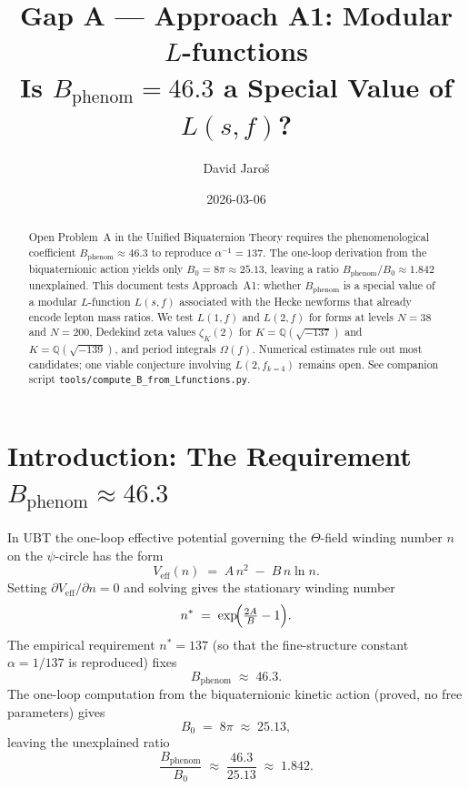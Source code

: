 \documentclass[12pt,a4paper]{article}
\title{\textbf{Gap A --- Approach A1: Modular $L$-functions}\\
         \large Is $B_{\mathrm{phenom}} = 46.3$ a Special Value of $L(s,f)$?}
\author{David Jaro\v{s}}
\date{2026-03-06}
\theoremstyle{definition}
\theoremstyle{remark}
\begin{document}
  \maketitle

  \begin{abstract}
  Open Problem~A in the Unified Biquaternion Theory requires the phenomenological
  coefficient $B_{\mathrm{phenom}} \approx 46.3$ to reproduce $\alpha^{-1} = 137$.
  The one-loop derivation from the biquaternionic action yields only $B_0 = 8\pi
  \approx 25.13$, leaving a ratio $B_{\mathrm{phenom}}/B_0 \approx 1.842$ unexplained.
  This document tests Approach~A1: whether $B_{\mathrm{phenom}}$ is a special value
  of a modular $L$-function $L(s,f)$ associated with the Hecke newforms that already
  encode lepton mass ratios.  We test $L(1,f)$ and $L(2,f)$ for forms at levels
  $N = 38$ and $N = 200$, Dedekind zeta values $\zeta_K(2)$ for
  $K = \mathbb{Q}(\sqrt{-137})$ and $K = \mathbb{Q}(\sqrt{-139})$, and period
  integrals $\Omega(f)$.  Numerical estimates rule out most candidates; one viable
  conjecture involving $L(2, f_{k=4})$ remains open.  See companion script
  \texttt{tools/compute\_B\_from\_Lfunctions.py}.
  \end{abstract}
\fi

\section{Introduction: The Requirement $B_{\mathrm{phenom}} \approx 46.3$}
\label{sec:intro}

In UBT the one-loop effective potential governing the $\Theta$-field winding
number $n$ on the $\psi$-circle has the form
\begin{equation}
  V_{\mathrm{eff}}(n) \;=\; A\,n^2 \;-\; B\,n\ln n .
  \label{eq:Veff}
\end{equation}
Setting $\partial V_{\mathrm{eff}}/\partial n = 0$ and solving gives the
stationary winding number
\begin{equation}
  n^* \;=\; \exp\!\Bigl(\tfrac{2A}{B} - 1\Bigr).
  \label{eq:nstar}
\end{equation}
The empirical requirement $n^* = 137$ (so that the fine-structure constant
$\alpha = 1/137$ is reproduced) fixes
\begin{equation}
  B_{\mathrm{phenom}} \;\approx\; 46.3 .
  \label{eq:Bphenom}
\end{equation}
The one-loop computation from the biquaternionic kinetic action (proved,
no free parameters) gives
\begin{equation}
  B_0 \;=\; 8\pi \;\approx\; 25.13,
  \label{eq:B0}
\end{equation}
leaving the unexplained ratio
\begin{equation}
  \frac{B_{\mathrm{phenom}}}{B_0}
  \;\approx\; \frac{46.3}{25.13}
  \;\approx\; 1.842.
  \label{eq:ratio}
\end{equation}
\end{document}
